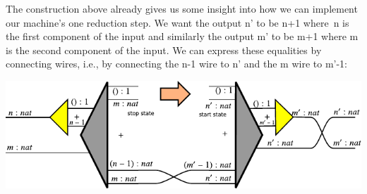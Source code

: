 \documentclass{llncs}
\begin{document}
The construction above already gives us some insight into how we can
implement our machine's one reduction step. We want the output {{n'}} to be
{{n+1}} where~{{n}} is the first component of the input and similarly the
output {{m'}} to be {{m+1}} where {{m}} is the second component of the input.
We can express these equalities by connecting wires, i.e., by connecting the
{{n-1}} wire to {{n'}} and the {{m}} wire to {{m'-1}}:

\begin{center}
  \includegraphics{diagrams/nat-nat5.pdf}
\end{center}





\end{document}
